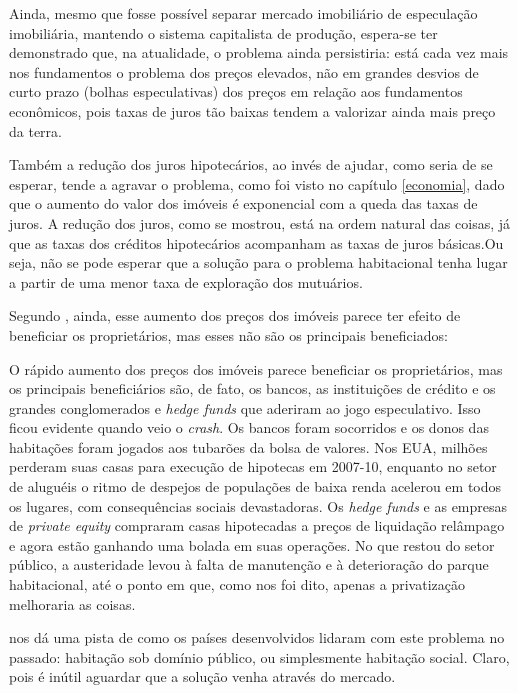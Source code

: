 \documentclass[
	12pt,				%
	oneside,			%
	a4paper,			%
	chapter=TITLE,		%
	section=TITLE,		%
	english,			%
	brazil				%
	]{abntex2}
\begin{document}
\begin{refsection}
Ainda, mesmo que fosse possível separar mercado imobiliário de especulação
imobiliária, mantendo o sistema capitalista de produção, espera-se ter
demonstrado que, na atualidade, o problema ainda persistiria: está cada vez mais
nos fundamentos o problema dos preços elevados, não em grandes desvios de curto
prazo (bolhas especulativas) dos preços em relação aos fundamentos econômicos,
pois taxas de juros tão baixas tendem a valorizar ainda mais preço da terra.

Também a redução dos juros hipotecários, ao invés de ajudar, como seria de se
esperar, tende a agravar o problema, como foi visto no capítulo \ref{economia},
dado que o aumento do valor dos imóveis é exponencial com a queda das taxas de
juros. A redução dos juros, como se mostrou, está na ordem natural das
coisas, já que as taxas dos créditos hipotecários acompanham as taxas de juros
básicas.Ou seja, não se pode esperar que a solução para o problema habitacional
tenha lugar a partir de uma menor taxa de exploração dos mutuários.

Segundo \textcite{terraredonda}, ainda, esse aumento dos preços dos imóveis parece ter
efeito de beneficiar os proprietários, mas esses não são os principais
beneficiados:
\begin{citacao}
O rápido aumento dos preços dos imóveis parece beneficiar os proprietários, mas
os principais beneficiários são, de fato, os bancos, as instituições de crédito
e os grandes conglomerados e \emph{hedge funds} que aderiram ao jogo
especulativo.
Isso ficou evidente quando veio o \emph{crash}. Os bancos foram socorridos e os
donos das habitações foram jogados aos tubarões da bolsa de valores. Nos \gls{EUA},
milhões perderam suas casas para execução de hipotecas em 2007-10, enquanto no
setor de aluguéis o ritmo de despejos de populações de baixa renda acelerou em
todos os lugares, com consequências sociais devastadoras. Os \emph{hedge funds}
e as empresas de \emph{private equity} compraram casas hipotecadas a preços de
liquidação relâmpago e agora estão ganhando uma bolada em suas operações. No que
restou do setor público, a austeridade levou à falta de manutenção e à
deterioração do parque habitacional, até o ponto em que, como nos foi dito,
apenas a privatização melhoraria as coisas.
\end{citacao}
\textcite{terraredonda} nos dá uma pista de como os países desenvolvidos lidaram com este
problema no passado: habitação sob domínio público, ou simplesmente habitação
social. Claro, pois é inútil aguardar que a solução venha através do mercado.


\end{refsection}
\end{document}

